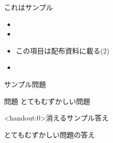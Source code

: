 \documentclass[notheorems, aspectratio=169, 12pt, tableusepdftitle=false]{beamer}
\begin{document}
\begin{frame}[plain]
 \titlepage
\end{frame}

\begin{frame}{これはサンプル}
 \begin{itemize}
  \item {}
  \item<handout:0> 
  \item<2-> \alert{この項目は配布資料に載る(2)}
  \item<2-|handout:0> 
 \end{itemize}
\end{frame}

\begin{frame}{サンプル}{問題}
 \begin{alertblock}{問題}
  とてもむずかしい問題
 \end{alertblock}
\end{frame}

\begin{frame}<handout:0>{消えるサンプル}{答え}
\begin{ans}
 とてもむずかしい問題の答え
\end{ans}
\end{frame}
\end{document}
